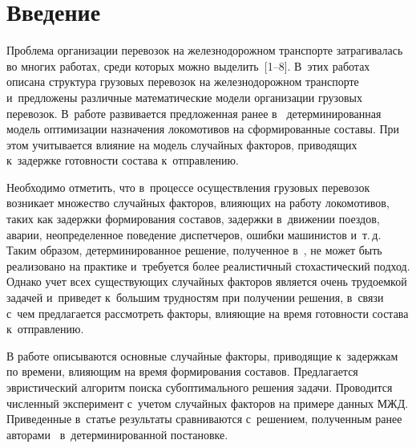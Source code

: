 

\vspace*{-8pt}



\thispagestyle{headings}

\begin{multicols}{2}

\label{st\stat}

\section{Введение}

\vspace*{-4pt}
    
Проблема организации перевозок на железнодорожном транспорте затрагивалась 
во многих работах, среди которых можно выделить~[1--8].
В~этих работах описана структура грузовых перевозок на железнодорожном транспорте и~предложены
различные математические модели организации грузовых перевозок.
В~работе развивается предложенная ранее 
в~\cite{AzanovBuyanov} детерминированная модель
оптимизации назначения локомотивов на сформированные составы.
При этом учитывается влияние на модель случайных факторов, приводящих 
к~задержке готовности состава к~отправлению.
    
Необходимо отметить, что в~процессе осуществления грузовых перевозок 
возникает множество случайных факторов,
влияющих на работу локомотивов, таких как
задержки формирования составов, задержки в~движении поездов, аварии, 
неопределенное поведение диспетчеров, ошибки машинистов и~т.\,д. 
Таким образом, детерминированное решение, полученное в~\cite{AzanovBuyanov}, 
не может быть реализовано на практике и~требуется более реалистичный 
стохастический подход. Однако учет всех существующих случайных факторов 
является очень трудоемкой задачей и~приведет к~большим трудностям при 
получении решения, в~связи с~чем предлагается рассмотреть факторы, влияющие 
на время готовности состава к~отправлению.
    

В работе описываются основные случайные факторы, приводящие к~задержкам по времени,\linebreak
влияющим на время формирования составов.
Предлагается эвристический алгоритм поиска субоптимального решения задачи.
Проводится чис\-лен\-ный эксперимент с~учетом случайных факторов на примере данных 
МЖД.
Приведенные в~статье результаты сравниваются с~решением, полученным
ранее авторами~\cite{AzanovBuyanov} в~детерминированной по\-ста\-новке.


\end{multicols}
